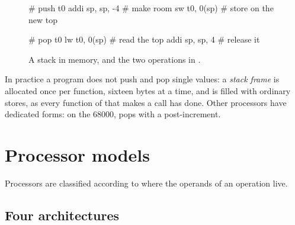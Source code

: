 \begin{figure}[htb]
\centering
\begin{minipage}{0.42\textwidth}\centering
{}
\end{minipage}
\begin{minipage}{0.5\textwidth}
\begin{asm}[numbers=none,xleftmargin=4pt,basicstyle=\ttfamily\footnotesize]
# push t0
addi sp, sp, -4      # make room
sw   t0, 0(sp)       # store on the new top

# pop t0
lw   t0, 0(sp)       # read the top
addi sp, sp, 4       # release it
\end{asm}
\end{minipage}
\caption{A stack in memory, and the two operations in \riscv.}
\label{fig:cpu:stack}
\end{figure}

In practice a \riscv program does not push and pop single values: a
\emph{stack frame} is allocated once per function, sixteen bytes at a time,
and is filled with ordinary stores, as every function of \vermone that makes
a call has done. Other processors have dedicated forms: on the 68000,
 pops with a post-increment.

\section{Processor models}

Processors are classified according to where the operands of an operation
live.

\subsection{Four architectures}


